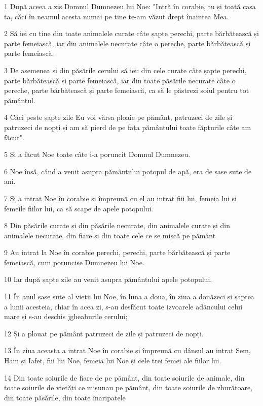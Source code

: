 \par 1 După aceea a zis Domnul Dumnezeu lui Noe: "Intră în corabie, tu și toată casa ta, căci în neamul acesta numai pe tine te-am văzut drept înaintea Mea.
\par 2 Să iei cu tine din toate animalele curate câte șapte perechi, parte bărbătească și parte femeiască, iar din animalele necurate câte o pereche, parte bărbătească și parte femeiască.
\par 3 De asemenea și din păsările cerului să iei: din cele curate câte șapte perechi, parte bărbătească și parte femeiască, iar din toate păsările necurate câte o pereche, parte bărbătească și parte femeiască, ca să le păstrezi soiul pentru tot pământul.
\par 4 Căci peste șapte zile Eu voi vărsa ploaie pe pământ, patruzeci de zile și patruzeci de nopți și am să pierd de pe fața pământului toate făpturile câte am făcut".
\par 5 Și a făcut Noe toate câte i-a poruncit Domnul Dumnezeu.
\par 6 Noe însă, când a venit asupra pământului potopul de apă, era de șase sute de ani.
\par 7 Și a intrat Noe în corabie și împreună cu el au intrat fiii lui, femeia lui și femeile fiilor lui, ca să scape de apele potopului.
\par 8 Din păsările curate și din păsările necurate, din animalele curate și din animalele necurate, din fiare și din toate cele ce se mișcă pe pământ
\par 9 Au intrat la Noe în corabie perechi, perechi, parte bărbătească și parte femeiască, cum poruncise Dumnezeu lui Noe.
\par 10 Iar după șapte zile au venit asupra pământului apele potopului.
\par 11 În anul șase sute al vieții lui Noe, în luna a doua, în ziua a douăzeci și șaptea a lunii acesteia, chiar în acea zi, s-au desfăcut toate izvoarele adâncului celui mare și s-au deschis jgheaburile cerului;
\par 12 Și a plouat pe pământ patruzeci de zile și patruzeci de nopți.
\par 13 În ziua aceasta a intrat Noe în corabie și împreună cu dânsul au intrat Sem, Ham și Iafet, fiii lui Noe, femeia lui Noe și cele trei femei ale fiilor lui.
\par 14 Din toate soiurile de fiare de pe pământ, din toate soiurile de animale, din toate soiurile de vietăți ce mișunau pe pământ, din toate soiurile de zburătoare, din toate păsările, din toate înaripatele
